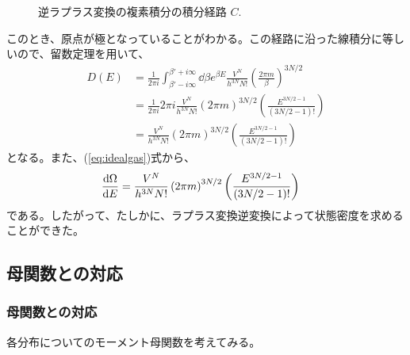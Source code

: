\documentclass[a4paper,11pt]{jsarticle}
\numberwithin{equation}{section}
\begin{document}
\begin{figure}[H]
  \centering
  \caption{逆ラプラス変換の複素積分の積分経路 $C$.}
  \end{figure}
このとき、原点が極となっていることがわかる。この経路に沿った線積分に等しいので、留数定理を用いて、
\begin{align}
  D(E) &= \frac{1}{2\pi i}\int_{\beta' - i\infty}^{\beta' + i\infty}\dd \beta e^{\beta E}\frac{V^N}{h^{3N}N!}\left( \frac{2\pi m}{\beta} \right)^{3N/2}\\
  &= \frac{1}{2\pi i} 2\pi i \frac{V^N}{h^{3N}N!}\left(2\pi m\right)^{3N/2}\left(\frac{E^{3N/2-1}}{(3N/2-1)!}\right)\\
  &= \frac{V^N}{h^{3N}N!}\left(2\pi m\right)^{3N/2}\left(\frac{E^{3N/2-1}}{(3N/2-1)!}\right)
\end{align}
となる。また、(\ref{eq:idealgas})式から、
\begin{align}
  \dv{\Omega}{E} &= \frac{V^N}{h^{3N}N!}\left(2\pi m\right)^{3N/2}\left(\frac{E^{3N/2-1}}{(3N/2-1)!}\right)
\end{align}
である。したがって、たしかに、ラプラス変換逆変換によって状態密度を求めることができた。

\subsection{母関数との対応}
\subsubsection{母関数との対応}
各分布についてのモーメント母関数を考えてみる。\\
\end{document}

